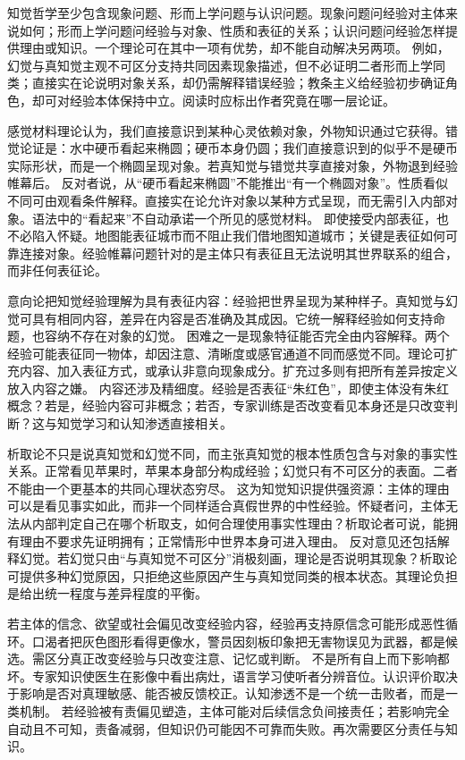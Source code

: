 知觉哲学至少包含现象问题、形而上学问题与认识问题。现象问题问经验对主体来说如何；形而上学问题问经验与对象、性质和表征的关系；认识问题问经验怎样提供理由或知识。一个理论可在其中一项有优势，却不能自动解决另两项。 例如，幻觉与真知觉主观不可区分支持共同因素现象描述，但不必证明二者形而上学同类；直接实在论说明对象关系，却仍需解释错误经验；教条主义给经验初步确证角色，却可对经验本体保持中立。阅读时应标出作者究竟在哪一层论证。

感觉材料理论认为，我们直接意识到某种心灵依赖对象，外物知识通过它获得。错觉论证是：水中硬币看起来椭圆；硬币本身仍圆；我们直接意识到的似乎不是硬币实际形状，而是一个椭圆呈现对象。若真知觉与错觉共享直接对象，外物退到经验帷幕后。 反对者说，从“硬币看起来椭圆”不能推出“有一个椭圆对象”。性质看似不同可由观看条件解释。直接实在论允许对象以某种方式呈现，而无需引入内部对象。语法中的“看起来”不自动承诺一个所见的感觉材料。 即使接受内部表征，也不必陷入怀疑。地图能表征城市而不阻止我们借地图知道城市；关键是表征如何可靠连接对象。经验帷幕问题针对的是主体只有表征且无法说明其世界联系的组合，而非任何表征论。

意向论把知觉经验理解为具有表征内容：经验把世界呈现为某种样子。真知觉与幻觉可具有相同内容，差异在内容是否准确及其成因。它统一解释经验如何支持命题，也容纳不存在对象的幻觉。 困难之一是现象特征能否完全由内容解释。两个经验可能表征同一物体，却因注意、清晰度或感官通道不同而感觉不同。理论可扩充内容、加入表征方式，或承认非意向现象成分。扩充过多则有把所有差异按定义放入内容之嫌。 内容还涉及精细度。经验是否表征“朱红色”，即使主体没有朱红概念？若是，经验内容可非概念；若否，专家训练是否改变看见本身还是只改变判断？这与知觉学习和认知渗透直接相关。

析取论不只是说真知觉和幻觉不同，而主张真知觉的根本性质包含与对象的事实性关系。正常看见苹果时，苹果本身部分构成经验；幻觉只有不可区分的表面。二者不能由一个更基本的共同心理状态穷尽\parencite{martin2004}。 这为知觉知识提供强资源：主体的理由可以是看见事实如此，而非一个同样适合真假世界的中性经验。怀疑者问，主体无法从内部判定自己在哪个析取支，如何合理使用事实性理由？析取论者可说，能拥有理由不要求先证明拥有；正常情形中世界本身可进入理由。 反对意见还包括解释幻觉。若幻觉只由“与真知觉不可区分”消极刻画，理论是否说明其现象？析取论可提供多种幻觉原因，只拒绝这些原因产生与真知觉同类的根本状态。其理论负担是给出统一程度与差异程度的平衡。

若主体的信念、欲望或社会偏见改变经验内容，经验再支持原信念可能形成恶性循环。口渴者把灰色图形看得更像水，警员因刻板印象把无害物误见为武器，都是候选。需区分真正改变经验与只改变注意、记忆或判断。 不是所有自上而下影响都坏。专家知识使医生在影像中看出病灶，语言学习使听者分辨音位。认识评价取决于影响是否对真理敏感、能否被反馈校正。认知渗透不是一个统一击败者，而是一类机制。 若经验被有责偏见塑造，主体可能对后续信念负间接责任；若影响完全自动且不可知，责备减弱，但知识仍可能因不可靠而失败。再次需要区分责任与知识。

